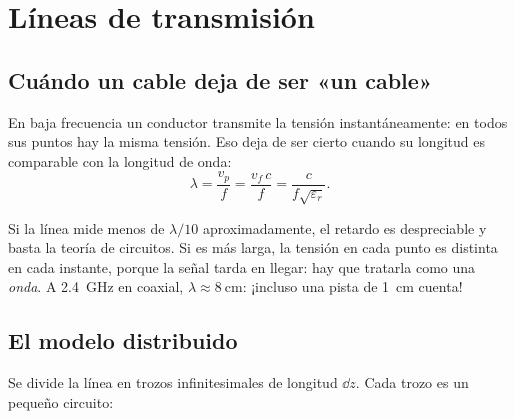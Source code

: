 \chapter{Líneas de transmisión}\label{cap:lineas}

\section{Cuándo un cable deja de ser «un cable»}

En baja frecuencia un conductor transmite la tensión instantáneamente: en todos sus puntos hay la misma tensión. Eso deja de ser
cierto cuando su longitud es comparable con la longitud de onda:
\begin{equation}
  \lambda = \frac{v_p}{f} = \frac{v_f\,c}{f} = \frac{c}{f\sqrt{\varepsilon_r}} .
\end{equation}
\begin{donde}
\end{donde}
\begin{intuicion}
Si la línea mide menos de $\lambda/10$ aproximadamente, el retardo es despreciable y basta la teoría de circuitos. Si es más larga,
la tensión en cada punto es distinta en cada instante, porque la señal tarda en llegar: hay que tratarla como una \emph{onda}.
A \SI{2.4}{\giga\hertz} en coaxial, $\lambda \approx \SI{8}{\centi\metre}$: ¡incluso una pista de \SI{1}{\centi\metre} cuenta!
\end{intuicion}

\section{El modelo distribuido}

Se divide la línea en trozos infinitesimales de longitud $\dd z$. Cada trozo es un pequeño circuito:

